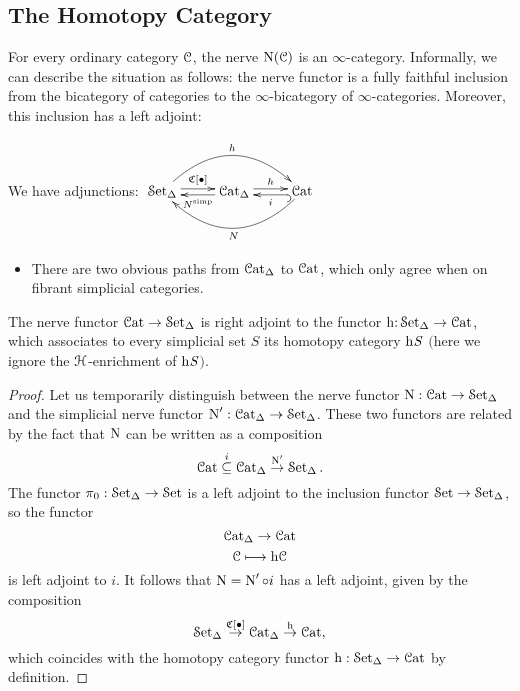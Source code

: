 \subsection{The Homotopy Category}\label{hcat}
\begin{1.2.3 The homotopy category}
For every ordinary category $\operatorname{\mathcal{C}}$, the nerve $\operatorname{N}(\operatorname{\mathcal{C}})$ is an $\infty$-category. 
Informally, we can describe the situation as follows: the nerve functor is a fully faithful inclusion from the bicategory of categories to the $\infty$-bicategory of $\infty$-categories.
Moreover, this inclusion has a left adjoint:

\begin{shaded}
We have adjunctions:
$\vcenter{\xymatrix{
\Set_\Delta
\ar@<.5ex>[r]^-{\sCoNerve[ \bigdot]}
\ar@/^2.62em/[rr]^-{h}
&%
\Cat_\Delta
\ar@<.5ex>[r]^-{h}
\ar@<.5ex>[l]^-{N^{\textup{simp}}}
&%
\Cat
\ar@{^{(}->}@<.5ex>[l]^-{i}
\ar@/^2.62em/[ll]^-{N}
}}$
\begin{itemize}\squishlist
\setlength{\parindent}{.25in}
\item There are two obvious paths from $\operatorname{\mathcal{C}at}_\Delta$ to $\operatorname{\mathcal{C}at}$, which only agree when on fibrant simplicial categories.
\end{itemize}
\end{shaded}
\begin{proposition}\label{leftadj}
The nerve functor $\operatorname{\mathcal{C}at} \rightarrow \operatorname{\mathcal{S}et_{\Delta}}$ is right adjoint to the functor
$\rm{h} \it{:} \operatorname{\mathcal{S}et_{\Delta}} \rightarrow \operatorname{\mathcal{C}at}$, which associates to every simplicial set $S$ its
homotopy category $\rm{h} \it{S}$ $($here we ignore the $\operatorname{\mathcal{H}}$-enrichment of $\rm{h} \it{S}${}$)$.
\end{proposition}

\begin{proof}
Let us temporarily distinguish between the nerve functor $\operatorname{N}: \operatorname{\mathcal{C}at} \rightarrow \operatorname{\mathcal{S}et_{\Delta}}$
and the simplicial nerve functor $\operatorname{N}': \operatorname{\mathcal{C}at_{\Delta}} \rightarrow \operatorname{\mathcal{S}et_{\Delta}}$. These two functors are related by the fact that $\operatorname{N}$ can be written as a composition
$$ \operatorname{\mathcal{C}at} \stackrel{i}{\subseteq} \operatorname{\mathcal{C}at_{\Delta}} \stackrel{\operatorname{N}'}{\rightarrow} \operatorname{\mathcal{S}et_{\Delta}}.$$
The functor $\pi_0: \operatorname{\mathcal{S}et_{\Delta}} \rightarrow \operatorname{\mathcal{S}et}$ is a left adjoint to the inclusion functor
$\operatorname{\mathcal{S}et} \rightarrow \operatorname{\mathcal{S}et_{\Delta}}$, so the functor
$$ \operatorname{\mathcal{C}at_{\Delta}} \rightarrow \operatorname{\mathcal{C}at}$$
$$ \operatorname{\mathcal{C}} \longmapsto \rm{h} \it{\operatorname{\mathcal{C}}}$$
is left adjoint to $i$. It follows that $\operatorname{N} = \operatorname{N}' \circ i$ has a left adjoint, given by the composition
$$ \operatorname{\mathcal{S}et_{\Delta}} \stackrel{ \operatorname{\mathfrak{C}}[ \bullet] }{\rightarrow} \operatorname{\mathcal{C}at_{\Delta}} \stackrel{ \rm{h} \it{}}{\rightarrow} \operatorname{\mathcal{C}at},$$
which coincides with the homotopy category functor $\rm{h} \it{}: \operatorname{\mathcal{S}et_{\Delta}} \rightarrow \operatorname{\mathcal{C}at}$ by definition.
\end{proof}


\end{1.2.3 The homotopy category}
